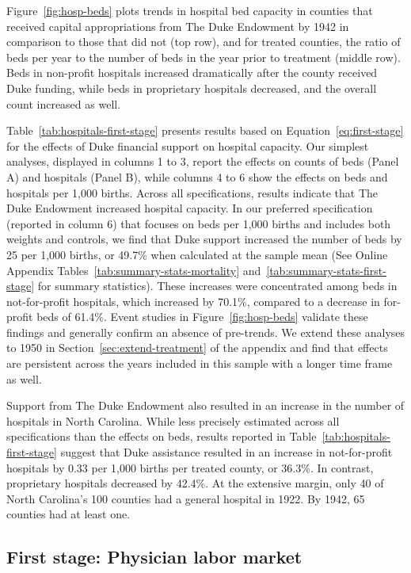 \documentclass[12pt]{article}
\begin{document}
Figure~\ref{fig:hosp-beds} plots trends in hospital bed capacity in counties that received capital appropriations from The Duke Endowment by 1942 in comparison to those that did not (top row), and for treated counties, the ratio of beds per year to the number of beds in the year prior to treatment (middle row). 
Beds in non-profit hospitals increased dramatically after the county received Duke funding, while beds in proprietary hospitals decreased, and the overall count increased as well. 

Table~\ref{tab:hospitals-first-stage} presents results based on Equation~\ref{eq:first-stage} for the effects of Duke financial support on hospital capacity. 
Our simplest analyses, displayed in columns 1 to 3, report the effects on counts of beds (Panel A) and hospitals (Panel B), while columns 4 to 6 show the effects on beds and hospitals per 1,000 births. 
Across all specifications, results indicate that The Duke Endowment increased hospital capacity. 
In our preferred specification (reported in column 6) that focuses on beds per 1,000 births and includes both weights and controls, we find that Duke support increased the number of beds by 25 per 1,000 births, or 49.7\% when calculated at the sample mean (See Online Appendix Tables~\ref{tab:summary-stats-mortality} and~\ref{tab:summary-stats-first-stage} for summary statistics). These increases were concentrated among beds in not-for-profit hospitals, which increased by 70.1\%, compared to a decrease in for-profit beds of 61.4\%. 
Event studies in Figure~\ref{fig:hosp-beds} validate these findings and generally confirm an absence of pre-trends. We extend these analyses to 1950 in Section~\ref{sec:extend-treatment} of the appendix and find that effects are persistent across the years included in this sample with a longer time frame as well. 

Support from The Duke Endowment also resulted in an increase in the number of hospitals in North Carolina. 
While less precisely estimated across all specifications than the effects on beds, results reported in Table~\ref{tab:hospitals-first-stage} suggest that Duke assistance resulted in an increase in not-for-profit hospitals by 0.33 per 1,000 births per treated county, or 36.3\%. 
In contrast, proprietary hospitals decreased by 42.4\%. 
At the extensive margin, only 40 of North Carolina's 100 counties had a general hospital in 1922. By 1942, 65 counties had at least one. 


\subsection{First stage: Physician labor market} \label{subsec:labor}
\end{document}
